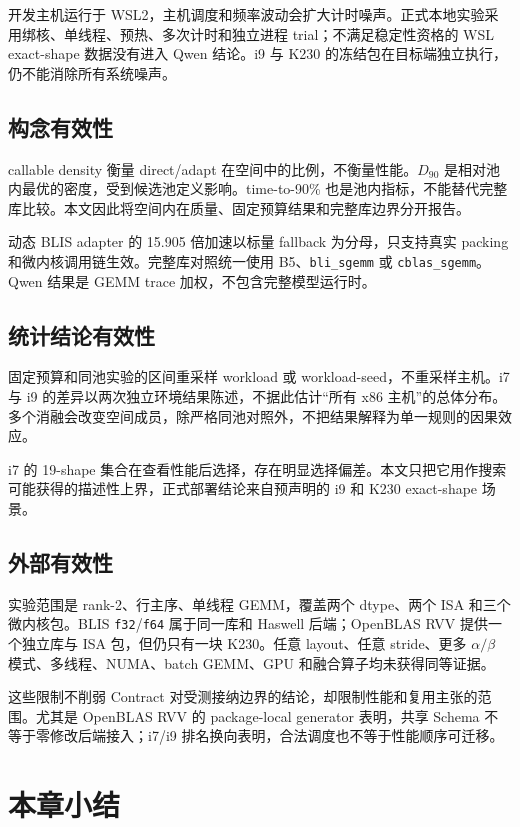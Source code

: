 开发主机运行于 WSL2，主机调度和频率波动会扩大计时噪声。正式本地实验采用绑核、单线程、预热、多次计时和独立进程 trial；不满足稳定性资格的 WSL exact-shape 数据没有进入 Qwen 结论。i9 与 K230 的冻结包在目标端独立执行，仍不能消除所有系统噪声。

\subsection{构念有效性}

callable density 衡量 direct/adapt 在空间中的比例，不衡量性能。$D_{90}$ 是相对池内最优的密度，受到候选池定义影响。time-to-90\% 也是池内指标，不能替代完整库比较。本文因此将空间内在质量、固定预算结果和完整库边界分开报告。

动态 BLIS adapter 的 15.905 倍加速以标量 fallback 为分母，只支持真实 packing 和微内核调用链生效。完整库对照统一使用 B5、\texttt{bli\_sgemm} 或 \texttt{cblas\_sgemm}。Qwen 结果是 GEMM trace 加权，不包含完整模型运行时。

\subsection{统计结论有效性}

固定预算和同池实验的区间重采样 workload 或 workload-seed，不重采样主机。i7 与 i9 的差异以两次独立环境结果陈述，不据此估计“所有 x86 主机”的总体分布。多个消融会改变空间成员，除严格同池对照外，不把结果解释为单一规则的因果效应。

i7 的 19-shape 集合在查看性能后选择，存在明显选择偏差。本文只把它用作搜索可能获得的描述性上界，正式部署结论来自预声明的 i9 和 K230 exact-shape 场景。

\subsection{外部有效性}

实验范围是 rank-2、行主序、单线程 GEMM，覆盖两个 dtype、两个 ISA 和三个微内核包。BLIS \texttt{f32}/\texttt{f64} 属于同一库和 Haswell 后端；OpenBLAS RVV 提供一个独立库与 ISA 包，但仍只有一块 K230。任意 layout、任意 stride、更多 $\alpha/\beta$ 模式、多线程、NUMA、batch GEMM、GPU 和融合算子均未获得同等证据。

这些限制不削弱 Contract 对受测接纳边界的结论，却限制性能和复用主张的范围。尤其是 OpenBLAS RVV 的 package-local generator 表明，共享 Schema 不等于零修改后端接入；i7/i9 排名换向表明，合法调度也不等于性能顺序可迁移。

\section{本章小结}

